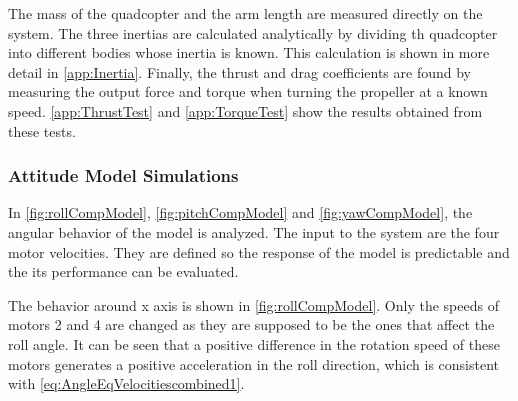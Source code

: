The mass of the quadcopter and the arm length are measured directly on the system. The three inertias are calculated analytically by dividing th quadcopter into different bodies whose inertia is known. This calculation is shown in more detail in \autoref{app:Inertia}. Finally, the thrust and drag coefficients are found by measuring the output force and torque when turning the propeller at a known speed. \autoref{app:ThrustTest} and \ref{app:TorqueTest} show the results obtained from these tests.

\subsubsection{Attitude Model Simulations}
In \autoref{fig:rollCompModel}, \ref{fig:pitchCompModel} and \ref{fig:yawCompModel}, the angular behavior of the model is analyzed. The input to the system are the four motor velocities. They are defined so the response of the model is predictable and the its performance can be evaluated.

The behavior around x axis is shown in \autoref{fig:rollCompModel}. Only the speeds of motors 2 and 4 are changed as they are supposed to be the ones that affect the roll angle. It can be seen that a positive difference in the rotation speed of these motors generates a positive acceleration in the roll direction, which is consistent with \autoref{eq:AngleEqVelocitiescombined1}.

